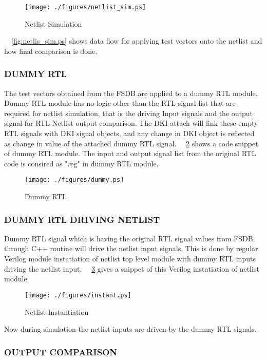\begin{figure}[h]
\centering
\texttt{[image: ./figures/netlist\_sim.ps]}
\caption{Netlist Simulation}
\label{fig:netlist_sim.ps}
\end{figure}

~\figurename{~\ref{fig:netlis_sim.ps}} shows data flow for applying test vectors onto the netlist and how final comparison is done.

\subsubsection{DUMMY RTL}
The test vectors obtained from the FSDB are applied to a dummy RTL module. Dummy RTL module has no logic other than the RTL signal list that are required for netlist simulation, that is the driving Input signals and the output signal for RTL-Netlist output comparison. The DKI attach will link these empty RTL signals with DKI signal objects, and any change in DKI object is reflected as change in value of the attached dummy RTL signal. ~\figurename{~\ref{fig:dummy.ps}} shows a code snippet of dummy RTL module. The input and output signal list from the original RTL code is consired as "{\emph reg}" in dummy RTL module.


\begin{figure}[h]
\centering
\texttt{[image: ./figures/dummy.ps]}
\caption{Dummy RTL}
\label{fig:dummy.ps}
\end{figure}

\subsubsection{DUMMY RTL DRIVING NETLIST}

Dummy RTL signal which is having the original RTL signal values from FSDB through C++ routine will drive the netlist input signals. This is done by regular Verilog module instatiation of netlist top level module with dummy RTL inputs driving the netlist input. ~\figurename{~\ref{fig:instant.ps}} gives a snippet of this Verilog instatiation of netlist module.

\begin{figure}[h]
\centering
\texttt{[image: ./figures/instant.ps]}
\caption{Netlist Instantiation}
\label{fig:instant.ps}
\end{figure}

Now during simulation the netlist inputs are driven by the dummy RTL signals.

\subsubsection{OUTPUT COMPARISON}

